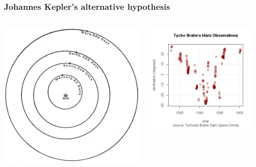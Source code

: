 \documentclass{beamer}
\begin{document}
\begin{frame}
  \frametitle{Johannes Kepler's alternative hypothesis}
  \begin{columns}
    \begin{column}{0.5\textwidth}
      \includegraphics[width=\columnwidth]{figures/orbits}
    \end{column}
    \begin{column}{0.5\textwidth}
      \includegraphics[width=\columnwidth]{figures/tycho-observations}

\end{column}
\end{columns}
\end{frame}
\end{document}

